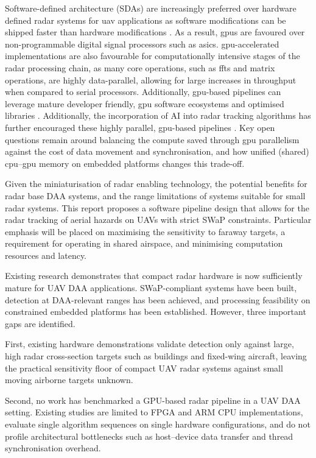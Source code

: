 Software-defined architecture (SDAs) are increasingly preferred over hardware defined
radar systems for \gls{uav} applications as software modifications can be shipped faster than
hardware modifications \cite{mordor_airborne_radars_market_2025}. As a result, \gls{gpu}s
are favoured over non-programmable digital signal processors such as \gls{asic}s.
\gls{gpu}-accelerated implementations are also favourable for computationally intensive
stages of the radar processing chain, as many core operations, such as \gls{fft}s and
matrix operations, are highly data-parallel, allowing for large increases in throughput
when compared to serial processors. Additionally, \gls{gpu}-based pipelines can leverage
mature developer friendly, \gls{gpu} software ecosystems and optimised libraries
\cite{zaknoun2024_realtime_gpu_accelerated_radar_processing}. Additionally,
the incorporation of AI into radar tracking algorithms has further encouraged these highly
parallel, \gls{gpu}-based pipelines \cite{electronics13214251}. Key open questions remain around
balancing the compute saved through \gls{gpu} parallelism against the cost of data movement and
synchronisation, and how unified (shared) \gls{cpu}--\gls{gpu} memory on embedded platforms changes
this trade-off.

Given the miniaturisation of radar enabling technology, the potential benefits for radar 
base DAA systems, and the range limitations of systems suitable for small radar systems. 
This report proposes a software pipeline design that allows for the radar tracking of 
aerial hazards on UAVs with strict SWaP constraints. Particular emphasis will be placed on 
maximising the sensitivity to faraway targets, a requirement for operating in shared 
airspace, and minimising computation resources and latency. 

Existing research demonstrates 
that compact radar hardware is now sufficiently mature for UAV DAA applications. 
SWaP-compliant systems have been built, detection at DAA-relevant ranges has been 
achieved, and processing feasibility on constrained embedded platforms has been 
established. However, three important gaps are identified.

First, existing hardware demonstrations validate detection only against large, 
high radar cross-section targets such as buildings and fixed-wing aircraft, 
leaving the practical sensitivity floor of compact UAV radar systems against 
small moving airborne targets unknown.

Second, no work has benchmarked a GPU-based radar pipeline in a UAV DAA 
setting. Existing studies are limited to FPGA and ARM CPU implementations, 
evaluate single algorithm sequences on single hardware configurations, and do 
not profile architectural bottlenecks such as host--device data transfer and 
thread synchronisation overhead.

